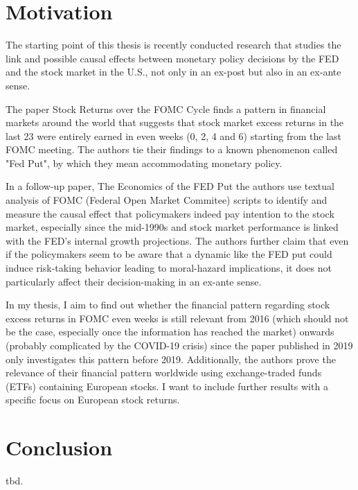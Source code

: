 
\chapter{Motivation}

The starting point of this thesis is recently conducted research that studies the link and possible causal effects between monetary policy decisions by the FED and the stock market in the U.S., not only in an ex-post but also in an ex-ante sense.

The paper Stock Returns over the FOMC Cycle \parencite{cieslak_stock_2019} finds a pattern in financial markets around the world that suggests that stock market excess returns in the last 23 were entirely earned in even weeks (0, 2, 4 and 6) starting from the last FOMC meeting. The authors tie their findings to a known phenomenon called "Fed Put", by which they mean accommodating monetary policy.

In a follow-up paper, The Economics of the FED Put \parencite{cieslak_economics_2021} the authors use textual analysis of FOMC (Federal Open Market Commitee) scripts to identify and measure the causal effect that policymakers indeed pay intention to the stock market, especially since the mid-1990s and stock market performance is linked with the FED’s internal growth projections. The authors further claim that even if the policymakers seem to be aware that a dynamic like the FED put could induce risk-taking behavior leading to moral-hazard implications, it does not particularly affect their decision-making in an ex-ante sense.

In my thesis, I aim to find out whether the financial pattern regarding stock excess returns in FOMC even weeks is still relevant from 2016 (which should not be the case, especially once the information has reached the market) onwards (probably complicated by the COVID-19 crisis) since the paper published in 2019 only investigates this pattern before 2019. Additionally, the authors prove the relevance of their financial pattern worldwide using exchange-traded funds (ETFs) containing European stocks. I want to include further results with a specific focus on European stock returns.






%

\chapter{Conclusion}

tbd.

